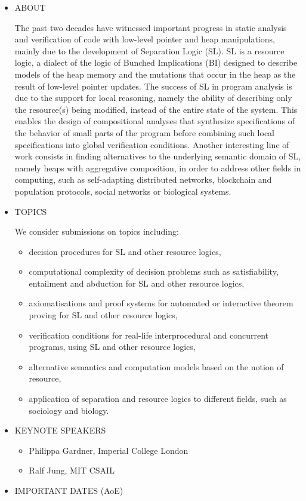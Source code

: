 \documentclass[prodmode,acmtecs]{acmsmall} %
\begin{document}
\begin{itemize}\item  ABOUT 
 
  The past two decades have witnessed important progress in static analysis and verification of code with low-level pointer and heap manipulations, mainly due to the development of Separation Logic (SL). SL is a resource logic, a dialect of the logic of Bunched Implications (BI) designed to describe models of the heap memory and the mutations that occur in the heap as the result of low-level pointer updates. The success of SL in program analysis is due to the support for local reasoning, namely the ability of describing only the resource(s) being modified, instead of the entire state of the system. This enables the design of compositional analyses that synthesize specifications of the behavior of small parts of the program before combining such local specifications into global verification conditions. Another interesting line of work consists in finding alternatives to the underlying semantic domain of SL, namely heaps with aggregative composition, in order to address other fields in computing, such as self-adapting distributed networks, blockchain and population protocols, social networks or biological systems.  
 
\item  TOPICS  
 
  We consider submissions on topics including: 
 
\begin{itemize}\item  decision procedures for SL and other resource logics,
\item  computational complexity of decision problems such as satisfiability, entailment and abduction for SL and other resource logics,
\item  axiomatisations and proof systems for automated or interactive theorem proving for SL and other resource logics,
\item  verification conditions for real-life interprocedural and concurrent programs, using SL and other resource logics,
\item  alternative semantics and computation models based on the notion of resource,
\item  application of separation and resource logics to different fields, such as sociology and biology.
\end{itemize} 
\item  KEYNOTE SPEAKERS 
 
\begin{itemize}\item  Philippa Gardner, Imperial College London
\item  Ralf Jung, MIT CSAIL
\end{itemize} 
\item  IMPORTANT DATES (AoE) 
 

\end{itemize}
\end{document}
